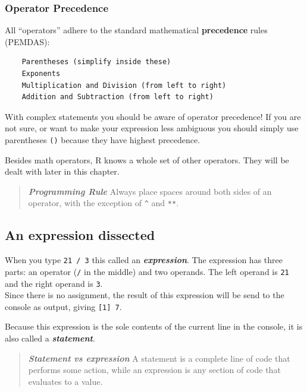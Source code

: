 \documentclass[]{book}
\begin{document}
\hypertarget{operator-precedence}{%
\subsubsection*{Operator Precedence}\label{operator-precedence}}

All ``operators'' adhere to the standard mathematical \textbf{precedence} rules (PEMDAS):

\begin{verbatim}
    Parentheses (simplify inside these)
    Exponents
    Multiplication and Division (from left to right)
    Addition and Subtraction (from left to right)
\end{verbatim}

With complex statements you should be aware of operator precedence! If you are not sure, or want to make your expression less ambiguous you should simply use parentheses \texttt{()} because they have highest precedence.

Besides math operators, R knows a whole set of other operators. They will be dealt with later in this chapter.

\begin{quote}
\textbf{\emph{Programming Rule}} Always place spaces around both sides of an operator, with the exception of \texttt{\^{}} and \texttt{**}.
\end{quote}

\hypertarget{an-expression-dissected}{%
\subsection{An expression dissected}\label{an-expression-dissected}}

When you type \texttt{21\ /\ 3} this called an \textbf{\emph{expression}}. The expression has three parts: an operator (\texttt{/} in the middle) and two operands. The left operand is \texttt{21} and the right operand is \texttt{3}.\\
Since there is no assignment, the result of this expression will be send to the console as output, giving \texttt{{[}1{]}\ 7}.

Because this expression is the sole contents of the current line in the console, it is also called a \textbf{\emph{statement}}.

\begin{quote}
\textbf{\emph{Statement vs expression}} A statement is a complete line of code that performs some action, while an expression is any section of code that evaluates to a value.
\end{quote}
\end{document}
